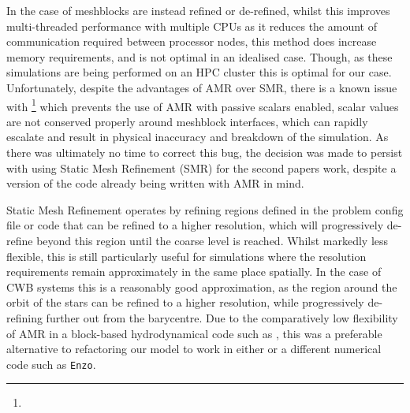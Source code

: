 In the case of \athena{} meshblocks are instead refined or de-refined, whilst this improves multi-threaded performance with multiple CPUs as it reduces the amount of communication required between processor nodes, this method does increase memory requirements, and is not optimal in an idealised case.
Though, as these simulations are being performed on an HPC cluster this is optimal for our case.
Unfortunately, despite the advantages of AMR over SMR, there is a known issue with \athena{}\footnote{} which prevents the use of AMR with passive scalars enabled, scalar values are not conserved properly around meshblock interfaces, which can rapidly escalate and result in physical inaccuracy and breakdown of the simulation.
As there was ultimately no time to correct this bug, the decision was made to persist with using Static Mesh Refinement (SMR) for the second papers work, despite a version of the code already being written with AMR in mind.

Static Mesh Refinement operates by refining regions defined in the problem config file or code that can be refined to a higher resolution, which will progressively de-refine beyond this region until the coarse level is reached.
Whilst markedly less flexible, this is still particularly useful for simulations where the resolution requirements remain approximately in the same place spatially.
In the case of CWB systems this is a reasonably good approximation, as the region around the orbit of the stars can be refined to a higher resolution, while progressively de-refining further out from the barycentre.
Due to the comparatively low flexibility of AMR in a block-based hydrodynamical code such as \athena{}, this was a preferable alternative to refactoring our model to work in either \mg{} or a different numerical code such as \texttt{Enzo}.



